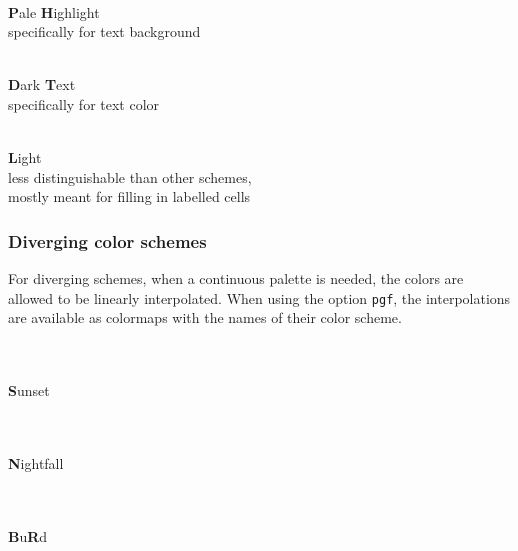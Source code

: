 \documentclass{scrartcl}
\begin{document}
\begin{minipage}{0.5\textwidth}
    \centering
    \\
    \textbf{P}ale \textbf{H}ighlight\\
    specifically for text background
\end{minipage}\hfill%
\begin{minipage}{0.5\textwidth}
    \centering
    \\
    \textbf{D}ark \textbf{T}ext\\
    specifically for text color
\end{minipage}

\begin{center}
    \\
    \textbf{L}ight\\
    less distinguishable than other schemes,\\ mostly meant for filling in labelled cells
\end{center}\clearpage

\subsubsection{Diverging color schemes}\label{sec:T-D}
For diverging schemes, when a continuous palette is needed, the colors are allowed to be linearly interpolated.
When using the option \verb!pgf!, the interpolations are available as colormaps with the names of their color scheme.

\begin{center}
    \\
    \\
    \textbf{S}unset
\end{center}

\begin{center}
    \\
    \\
    \textbf{N}ightfall
\end{center}

\begin{center}
    \\
    \\
    \textbf{B}u\textbf{R}d
\end{center}
\end{document}
